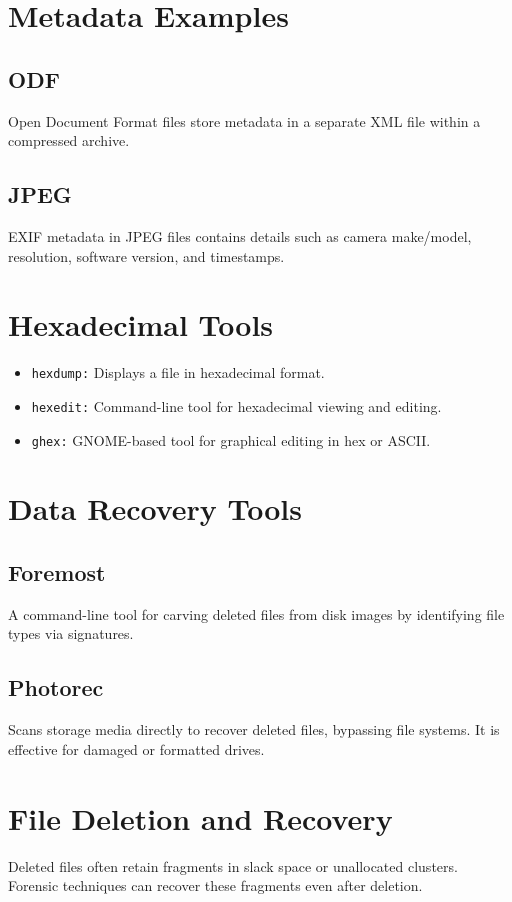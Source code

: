 \section{Metadata Examples}
\subsection{ODF}
Open Document Format files store metadata in a separate XML file within a compressed archive.
\subsection{JPEG}
EXIF metadata in JPEG files contains details such as camera make/model, resolution, software version, and timestamps.

\section{Hexadecimal Tools}
\begin{itemize}
    \item \texttt{hexdump:} Displays a file in hexadecimal format.
    \item \texttt{hexedit:} Command-line tool for hexadecimal viewing and editing.
    \item \texttt{ghex:} GNOME-based tool for graphical editing in hex or ASCII.
\end{itemize}

\section{Data Recovery Tools}
\subsection{Foremost}
A command-line tool for carving deleted files from disk images by identifying file types via signatures.
\subsection{Photorec}
Scans storage media directly to recover deleted files, bypassing file systems. It is effective for damaged or formatted drives.

\section{File Deletion and Recovery}
Deleted files often retain fragments in slack space or unallocated clusters. Forensic techniques can recover these fragments even after deletion.

